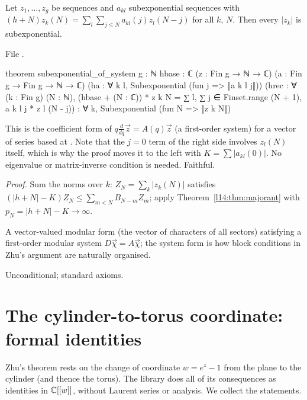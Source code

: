 \begin{theorem}\label{l14:thm:system}
Let $z_1,\dots,z_g$ be sequences and $a_{kl}$ subexponential sequences with
$(h+N)z_k(N) = \sum_l\sum_{j\le N}a_{kl}(j)z_l(N-j)$ for all $k$, $N$. Then every $|z_k|$ is subexponential.
\end{theorem}
\noindent File .
\begin{leancode}
theorem subexponential_of_system {g : ℕ} {hbase : ℂ}
    (z : Fin g → ℕ → ℂ) (a : Fin g → Fin g → ℕ → ℂ)
    (ha : ∀ k l, Subexponential (fun j => ‖a k l j‖))
    (hrec : ∀ (k : Fin g) (N : ℕ),
      (hbase + (N : ℂ)) * z k N
        = ∑ l, ∑ j ∈ Finset.range (N + 1), a k l j * z l (N - j)) :
    ∀ k, Subexponential (fun N => ‖z k N‖)
\end{leancode}
\begin{dictionary}
This is the coefficient form of $q\frac{d}{dq}\vec z = A(q)\vec z$ (a first-order system) for a vector of series based at
. Note that the $j=0$ term of the right side involves $z_l(N)$ itself, which is why the proof moves it to the left
with $K = \sum|a_{kl}(0)|$. No eigenvalue or matrix-inverse condition is needed. Faithful.
\end{dictionary}
\noindent\emph{Proof.} Sum the norms over $k$: $Z_N = \sum_k|z_k(N)|$ satisfies $(|h+N| - K)Z_N\le\sum_{m<N}B_{N-m}Z_m$; apply
Theorem~\ref{l14:thm:majorant} with $p_N = |h+N| - K\to\infty$.
\begin{physics}
A vector-valued modular form (the vector of characters of all sectors) satisfying a first-order modular system
$D\vec\chi = A\vec\chi$; the system form is how block conditions in Zhu's argument are naturally organised.
\end{physics}
\begin{status}
Unconditional; standard axioms.
\end{status}

\section{The cylinder-to-torus coordinate: formal identities}\label{l14:sec:coord}

Zhu's theorem rests on the change of coordinate $w = e^z - 1$ from the plane to the cylinder (and thence the torus). The library
does all of its consequences as identities in ${\mathbb{C}}[[w]]$, without Laurent series or analysis. We collect the statements.

